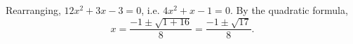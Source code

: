 Rearranging, $12x^2+3x-3=0$, i.e. $4x^2+x-1=0$. By the quadratic formula,
\[x=\dfrac{-1\pm\sqrt{1+16}}{8}=\boxed{\dfrac{-1\pm\sqrt{17}}{8}}.\]
